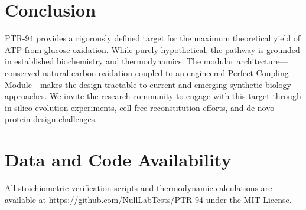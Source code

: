 \documentclass[12pt]{article}
\begin{document}
\section{Conclusion}

PTR-94 provides a rigorously defined target for the maximum theoretical yield of ATP from glucose oxidation. While purely hypothetical, the pathway is grounded in established biochemistry and thermodynamics. The modular architecture---conserved natural carbon oxidation coupled to an engineered Perfect Coupling Module---makes the design tractable to current and emerging synthetic biology approaches. We invite the research community to engage with this target through in silico evolution experiments, cell-free reconstitution efforts, and de novo protein design challenges.

\section*{Data and Code Availability}

All stoichiometric verification scripts and thermodynamic calculations are available at \url{https://github.com/NullLabTests/PTR-94} under the MIT License.
\end{document}
